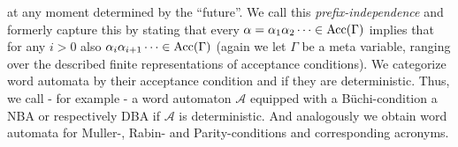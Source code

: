 at any moment determined by the \enquote{future}. We call this
\emph{prefix-independence} and formerly capture this by stating that every
$\alpha = \alpha_{1}\alpha_{2}\dots\in\operatorname{Acc}(\Gamma)$ implies that for any $i>0$
also $\alpha_{i}\alpha_{i+1}\dots\in\operatorname{Acc}(\Gamma)$ (again we let $\Gamma$ be a
meta variable, ranging over the described finite representations of acceptance
conditions). We categorize word automata by their acceptance condition and if
they are deterministic. Thus, we call - for example - a word automaton
$\mathcal{A}$ equipped with a Büchi-condition a \ac{NBA} or respectively
\ac{DBA} if $\mathcal{A}$ is deterministic. And analogously we obtain word
automata for Muller-, Rabin- and Parity-conditions and corresponding
acronyms. 

